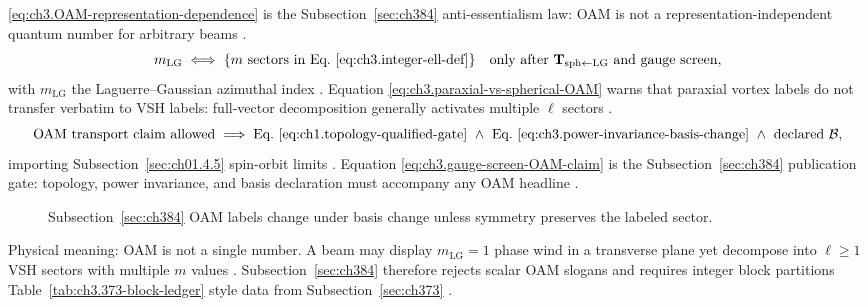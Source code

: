 \eqref{eq:ch3.OAM-representation-dependence} is the Subsection~\ref{sec:ch384} anti-essentialism law: OAM is not a representation-independent
quantum number for arbitrary beams \cite{harrington2001}.
\begin{equation}
\label{eq:ch3.paraxial-vs-spherical-OAM}
m_{\mathrm{LG}}
\;\Longleftrightarrow\;
\{m\ \text{sectors in Eq.~\eqref{eq:ch3.integer-ell-def}}\}
\quad\text{only after }\mathbf{T}_{\mathrm{sph}\leftarrow\mathrm{LG}}\ \text{and gauge screen},
\end{equation}
with \(m_{\mathrm{LG}}\) the Laguerre--Gaussian azimuthal index \cite{allen1992}. Equation
\eqref{eq:ch3.paraxial-vs-spherical-OAM} warns that paraxial vortex labels do not transfer verbatim to VSH labels: full-vector
decomposition generally activates multiple \(\ell\) sectors \cite{harrington2001}.
\begin{equation}
\label{eq:ch3.gauge-screen-OAM-claim}
\text{OAM transport claim allowed}
\;\Longrightarrow\;
\text{Eq.~\eqref{eq:ch1.topology-qualified-gate}}
\ \wedge\
\text{Eq.~\eqref{eq:ch3.power-invariance-basis-change}}
\ \wedge\
\text{declared }\mathcal{B},
\end{equation}
importing Subsection~\ref{sec:ch01.4.5} spin-orbit limits \cite{belinfante1940}. Equation
\eqref{eq:ch3.gauge-screen-OAM-claim} is the Subsection~\ref{sec:ch384} publication gate: topology, power invariance, and basis declaration
must accompany any OAM headline \cite{harrington2001}.
\begin{figure}[t]
\centering
{}
\caption{Subsection~\ref{sec:ch384} OAM labels change under basis change unless symmetry preserves the labeled sector.}
\label{fig:ch3.384-OAM-basis-shift}
\end{figure}
Physical meaning: OAM is not a single number. A beam may display \(m_{\mathrm{LG}}=1\) phase wind in a transverse plane yet decompose into \(\ell\ge1\) VSH sectors with multiple
\(m\) values \cite{allen1992}. Subsection~\ref{sec:ch384} therefore rejects scalar OAM slogans and requires integer
block partitions Table~\ref{tab:ch3.373-block-ledger} style data from Subsection~\ref{sec:ch373} \cite{harrington2001}.
